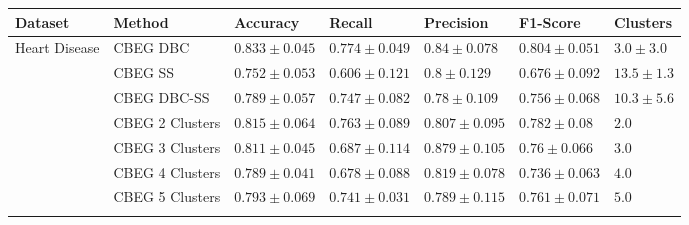 \documentclass[12pt,a4paper]{standalone}
\begin{document}
\begin{tabular}{lllllll}
    \toprule
    \textbf{Dataset}                & \textbf{Method}   & \textbf{Accuracy}                             & \textbf{Recall}                               & \textbf{Precision}                            & \textbf{F1-Score}                             & \textbf{Clusters} \\ \midrule
    \multirow{11}{*}{Heart Disease} & CBEG DBC          & \cellcolor{gray!50}$\mathbf{0.833 \pm 0.045}$ & \cellcolor{gray!50}$\mathbf{0.774 \pm 0.049}$ & $0.84 \pm 0.078$                              & \cellcolor{gray!50}$\mathbf{0.804 \pm 0.051}$ & $3.0 \pm 3.0$ \\ \nopagebreak
                                    & CBEG SS           & $0.752 \pm 0.053$                             & $0.606 \pm 0.121$                             & $0.8 \pm 0.129$                               & $0.676 \pm 0.092$                             & $13.5 \pm 1.3$ \\ \nopagebreak
                                    & CBEG DBC-SS       & $0.789 \pm 0.057$                             & $0.747 \pm 0.082$                             & $0.78 \pm 0.109$                              & $0.756 \pm 0.068$                             & $10.3 \pm 5.6$ \\ \nopagebreak
                                    & CBEG 2 Clusters   & $0.815 \pm 0.064$                             & $0.763 \pm 0.089$                             & $0.807 \pm 0.095$                             & $0.782 \pm 0.08$                              & $2.0$ \\ \nopagebreak
                                    & CBEG 3 Clusters   & $0.811 \pm 0.045$                             & $0.687 \pm 0.114$                             & \cellcolor{gray!50}$\mathbf{0.879 \pm 0.105}$ & $0.76 \pm 0.066$                              & $3.0$ \\ \nopagebreak
                                    & CBEG 4 Clusters   & $0.789 \pm 0.041$                             & $0.678 \pm 0.088$                             & $0.819 \pm 0.078$                             & $0.736 \pm 0.063$                             & $4.0$ \\ \nopagebreak
                                    & CBEG 5 Clusters   & $0.793 \pm 0.069$                             & $0.741 \pm 0.031$                             & $0.789 \pm 0.115$                             & $0.761 \pm 0.071$                             & $5.0$ \\ \cmidrule{2-7}

\end{tabular}
\end{document}
